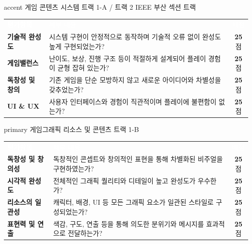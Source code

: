 \documentclass[11pt, a4paper]{article}
\begin{document}
\begin{trackheader}{accent}
  게임 콘텐츠 시스템 \hfill
  {\normalfont\small\color{textmuted} 트랙 1-A \;/\; 트랙 2 IEEE 부산 섹션 트랙}
\end{trackheader}
\vspace{-4pt}
\begin{infocard}[colframe=accent!30]
\renewcommand{\arraystretch}{1.5}
\begin{tabularx}{\textwidth}{@{}>{\bfseries}l X c@{}}
  \rowcolor{tabhead}
  \textcolor{white}{\textsf{평가항목}} &
  \textcolor{white}{\textsf{세부 내용}} &
  \textcolor{white}{\textsf{배점}} \\
  기술적 완성도
    & 시스템 구현이 안정적으로 동작하며 기술적 오류 없이 완성도 높게 구현되었는가?
    & \textbf{25}점 \\
  \rowcolor{tabrow}
  게임밸런스
    & 난이도, 보상, 진행 구조 등이 적절하게 설계되어 플레이 경험이 균형 잡혀 있는가?
    & \textbf{25}점 \\
  독창성 및 창의
    & 기존 게임을 단순 모방하지 않고 새로운 아이디어와 차별성을 갖추었는가?
    & \textbf{25}점 \\
  \rowcolor{tabrow}
  UI \& UX
    & 사용자 인터페이스와 경험이 직관적이며 플레이에 불편함이 없는가?
    & \textbf{25}점 \\
\end{tabularx}
\end{infocard}

\vspace{10pt}

\begin{trackheader}{primary}
  게임그래픽 리소스 및 콘텐츠 \hfill
  {\normalfont\small\color{textmuted} 트랙 1-B}
\end{trackheader}
\vspace{-4pt}
\begin{infocard}[colframe=primary!30]
\renewcommand{\arraystretch}{1.5}
\begin{tabularx}{\textwidth}{@{}>{\bfseries}l X c@{}}
  \rowcolor{tabhead}
  \textcolor{white}{\textsf{평가항목}} &
  \textcolor{white}{\textsf{세부 내용}} &
  \textcolor{white}{\textsf{배점}} \\
  독창성 및 창의성
    & 독창적인 콘셉트와 창의적인 표현을 통해 차별화된 비주얼을 구현하였는가?
    & \textbf{25}점 \\
  \rowcolor{tabrow}
  시각적 완성도
    & 전체적인 그래픽 퀄리티와 디테일이 높고 완성도가 우수한가?
    & \textbf{25}점 \\
  리소스의 일관성
    & 캐릭터, 배경, UI 등 모든 그래픽 요소가 일관된 스타일로 구성되었는가?
    & \textbf{25}점 \\
  \rowcolor{tabrow}
  표현력 및 연출
    & 색감, 구도, 연출 등을 통해 의도한 분위기와 메시지를 효과적으로 전달하는가?
    & \textbf{25}점 \\
\end{tabularx}
\end{infocard}
\end{document}
